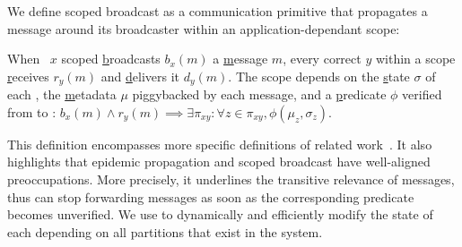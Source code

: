 %

We define scoped broadcast as a communication primitive that
propagates a message around its broadcaster within an
application-dependant scope:


\begin{definition}
  When \Process~$x$ scoped \underline{b}roadcasts $b_x(m)$ a
  \underline{m}essage $m$, every correct \process $y$ within a scope
  \underline{r}eceives $r_y(m)$ and \underline{d}elivers it
  $d_y(m)$. The scope depends on the \underline{s}tate $\sigma$ of
  each \process, the \underline{m}etadata $\mu$ piggybacked by each
  message, and a \underline{p}redicate $\phi$ verified from \process to
  \process: $b_x(m) \wedge r_y(m) \implies \exists \pi_{xy}: \forall z
  \in \pi_{xy}, \phi(\mu_z, \sigma_z)$.
\end{definition}

This definition encompasses more specific definitions of related
work~\cite{hsiao2005scoped, lue2006scoped, wang2015prodiluvian}.  It
also highlights that epidemic propagation and scoped broadcast have
well-aligned preoccupations. More precisely, it underlines the transitive relevance of
messages, thus \processes can stop forwarding messages as soon as the
corresponding predicate becomes unverified.
%
We use \NAMEB to dynamically and efficiently modify the state of each
\process depending on all partitions that exist in the system.

